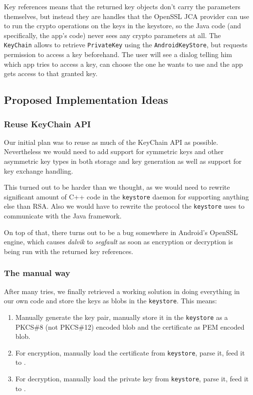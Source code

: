 \documentclass[a4paper,draft]{scrartcl}
\begin{document}
		Key references means that the returned key objects don't carry the parameters themselves, but instead they are	handles that the OpenSSL JCA provider can use to run the crypto operations on the keys in the keystore, so the Java code (and specifically, the app's code) never sees any crypto parameters at all. The \texttt{KeyChain} allows to retrieve \texttt{PrivateKey} using the \texttt{AndroidKeyStore}, but requests permission to access a key beforehand. The user will see a dialog telling him which app tries to access a key, can choose the one he wants to use and the app gets access to that granted key. 
		
	\subsection{Proposed Implementation Ideas}
		\subsubsection{Reuse KeyChain API}
			Our initial plan was to reuse as much of the KeyChain API as possible. Nevertheless we would need to add support	for symmetric keys and other asymmetric key types in both storage and key generation as well as support for key	exchange handling.

			This turned out to be harder than we thought, as we would need to rewrite significant amount of C++ code in the	\texttt{keystore} daemon for supporting anything else than RSA. Also we would have to rewrite the protocol the \texttt{keystore} uses to communicate with the Java framework.
			
			On top of that, there turns out to be a bug somewhere in Android's OpenSSL engine, which causes {\em dalvik} to	{\em segfault} as soon as encryption or decryption is being run with the returned key references.

		\subsubsection{The manual way}
			After many tries, we finally retrieved a working solution in doing everything in our own code and store the keys as blobs in the \texttt{keystore}. This means:
			\begin{enumerate}
				\item Manually generate the key pair, manually store it in the \texttt{keystore} as a PKCS\#8 (not PKCS\#12) encoded blob and the certificate as PEM encoded blob.
				\item For encryption, manually load the certificate from \texttt{keystore}, parse it, feed it to .
				\item For decryption, manually load the private key from \texttt{keystore}, parse it, feed it to .
			\end{enumerate}
\end{document}
